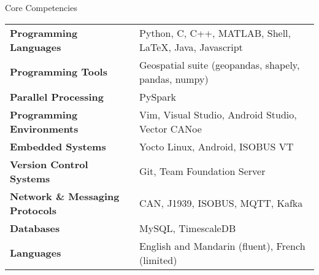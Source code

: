 \documentclass{resume}
\begin{document}
  \begin{rSection}{Core Competencies}
    \begin{tabular}{ @{} >{\bfseries}l @{\hspace{6ex}} l }
      Programming Languages & Python, C, C++, MATLAB, Shell, \LaTeX, Java,
        Javascript \\
      Programming Tools & Geospatial suite (geopandas, shapely, pandas,
      numpy) \\
      Parallel Processing & PySpark \\
      Programming Environments & Vim, Visual Studio, Android Studio, Vector
        CANoe \\
      Embedded Systems & Yocto Linux, Android, ISOBUS VT \\
      Version Control Systems & Git, Team Foundation Server \\
      Network \& Messaging Protocols & CAN, J1939, ISOBUS, MQTT, Kafka \\
      Databases & MySQL, TimescaleDB \\
      Languages & English and Mandarin (fluent), French (limited) \\
    \end{tabular}
  \end{rSection}
\end{document}

